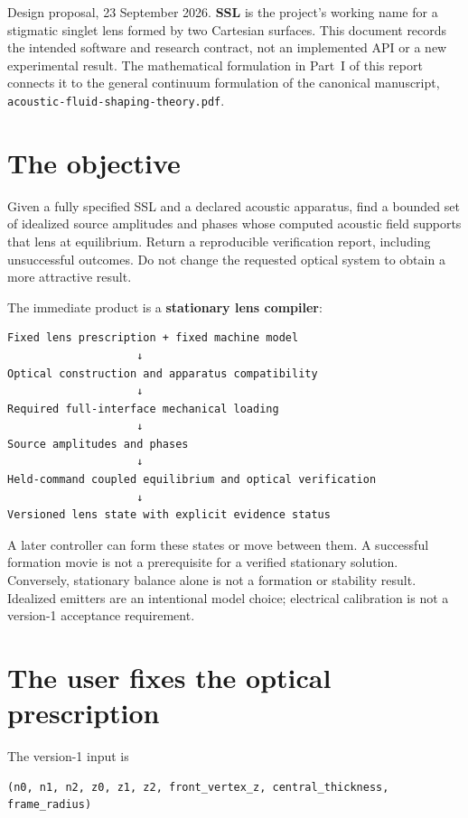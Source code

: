Design proposal, 23 September 2026. \textbf{SSL} is the project's
working name for a stigmatic singlet lens formed by two Cartesian
surfaces. This document records the intended software and research
contract, not an implemented API or a new experimental result. The
mathematical formulation in Part~I of this report connects it to the
general continuum formulation of the canonical manuscript,
\texttt{acoustic-fluid-shaping-theory.pdf}.

\section{The objective}\label{the-objective}

Given a fully specified SSL and a declared acoustic apparatus, find a
bounded set of idealized source amplitudes and phases whose computed
acoustic field supports that lens at equilibrium. Return a reproducible
verification report, including unsuccessful outcomes. Do not change the
requested optical system to obtain a more attractive result.

The immediate product is a \textbf{stationary lens compiler}:

\begin{verbatim}
Fixed lens prescription + fixed machine model
                    ↓
Optical construction and apparatus compatibility
                    ↓
Required full-interface mechanical loading
                    ↓
Source amplitudes and phases
                    ↓
Held-command coupled equilibrium and optical verification
                    ↓
Versioned lens state with explicit evidence status
\end{verbatim}

A later controller can form these states or move between them. A
successful formation movie is not a prerequisite for a verified
stationary solution. Conversely, stationary balance alone is not a
formation or stability result. Idealized emitters are an intentional
model choice; electrical calibration is not a version-1 acceptance
requirement.

\section{The user fixes the optical prescription}\label{the-user-fixes-the-optical-prescription}

The version-1 input is

\begin{verbatim}
(n0, n1, n2, z0, z1, z2, front_vertex_z, central_thickness, frame_radius)
\end{verbatim}

